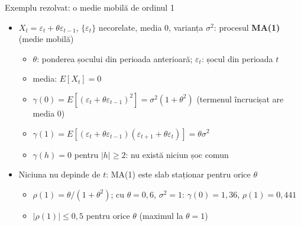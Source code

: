 \begin{frame}{Exemplu rezolvat: o medie mobilă de ordinul 1}
\itemsize{\small}
\begin{itemize}
    \item $X_t = \varepsilon_t + \theta\varepsilon_{t-1}$, $\{\varepsilon_t\}$ necorelate, media 0, varianța $\sigma^2$: procesul \textbf{MA(1)} (medie mobilă)
    \begin{itemize}
        \item $\theta$: ponderea șocului din perioada anterioară; $\varepsilon_t$: șocul din perioada $t$
        \item media: $E[X_t] = 0$
        \item $\gamma(0) = E[(\varepsilon_t + \theta\varepsilon_{t-1})^2] = \sigma^2(1 + \theta^2)$ (termenul încrucișat are media 0)
        \item $\gamma(1) = E[(\varepsilon_t + \theta\varepsilon_{t-1})(\varepsilon_{t+1} + \theta\varepsilon_t)] = \theta\sigma^2$
        \item $\gamma(h) = 0$ pentru $|h| \ge 2$: nu există niciun șoc comun
    \end{itemize}
    \item Niciuna nu depinde de $t$: MA(1) este slab staționar pentru orice $\theta$
    \begin{itemize}
        \item $\rho(1) = \theta/(1 + \theta^2)$; cu $\theta = 0{,}6$, $\sigma^2 = 1$: $\gamma(0) = 1{,}36$, $\rho(1) = 0{,}441$
        \item $|\rho(1)| \le 0{,}5$ pentru orice $\theta$ (maximul la $\theta = 1$)
    \end{itemize}
\end{itemize}
\end{frame}

